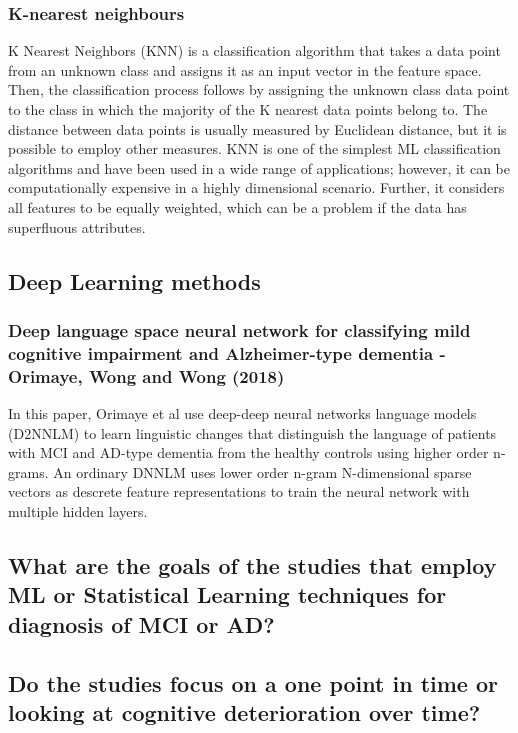 \documentclass[12pt]{article}
\begin{document}
\subsubsection{K-nearest neighbours}
K Nearest Neighbors (KNN) is a classification algorithm that takes a data point from an unknown class and assigns it as an input vector in the feature space. Then, the classification process follows by assigning the unknown class data point to the class in which the majority of the K nearest data points belong to. The distance between data points is usually measured by Euclidean distance, but it is possible to employ other measures. KNN is one of the simplest ML classification algorithms and have been used in a wide range of applications; however, it can be computationally expensive in a highly dimensional scenario. Further, it considers all features to be equally weighted, which can be a problem if the data has superfluous attributes.

\subsection{Deep Learning methods}
\subsubsection{Deep language space neural network for classifying mild cognitive impairment and Alzheimer-type dementia - Orimaye, Wong and Wong (2018)}
In this paper, Orimaye et al use deep-deep neural networks language models (D2NNLM) to learn linguistic changes that distinguish the language of patients with MCI and AD-type dementia from the healthy controls using higher order n-grams. An ordinary DNNLM uses lower order n-gram N-dimensional sparse vectors as descrete feature representations to train the neural network with multiple hidden layers.



\subsection{What are the goals of the studies that employ ML or Statistical Learning techniques for diagnosis of MCI or AD?}

\subsection{Do the studies focus on a one point in time or looking at cognitive deterioration over time?}
\end{document}
